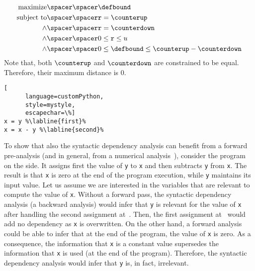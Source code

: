 \begin{example}
\begin{align}
  \text{maximize} \spacer\spacer& \defbound \\
  \text{subject to} \spacer\spacer
    & \texttt{r} = \counterup \\
    \land\spacer\spacer& \texttt{r} = \counterdown \\
    \land\spacer\spacer& 0\le \texttt{r} \le u \\
    \land\spacer\spacer& 0 \le \defbound \le \counterup - \counterdown
\end{align}
Note that, both $\counterup$ and $\counterdown$ are constrained to be equal. Therefore, their maximum distance is $0$.
\end{example}

\begin{marginlisting}[*1]
  \begin{lstlisting}[
      language=customPython,
      style=mystyle,
      escapechar=\%]
x = y %\labline{first}%
x = x - y %\labline{second}%
\end{lstlisting}
  \end{marginlisting}
\begin{example}
  To show that also the syntactic dependency analysis can benefit from a forward pre-analysis (and in general, from a numerical analysis~), consider the program on the side.
  It assigns first the value of \texttt{y} to \texttt{x} and then subtracts \texttt{y} from \texttt{x}.
  The result is that \texttt{x} is zero at the end of the program execution, while \texttt{y} maintains its input value.
%
  Let us assume we are interested in the variables that are relevant to compute the value of \texttt{x}.
  Without a forward pass, the syntactic dependency analysis (a backward analysis) would infer that \texttt{y} is relevant for the value of \texttt{x} after handling the second assignment at~. Then, the first assignment at~ would add no dependency as \texttt{x} is overwritten.
  On the other hand, a forward analysis could be able to infer that at the end of the program, the value of \texttt{x} is zero.
  As a consequence, the information that \texttt{x} is a constant value supersedes the information that \texttt{x} is used (at the end of the program).
  Therefore, the syntactic dependency analysis would infer that \texttt{y} is, in fact, irrelevant.
\end{example}
